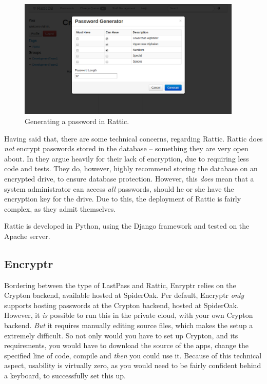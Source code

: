 			\begin{figure}[h!]
				\centering
				\includegraphics[width=0.95\textwidth]{figures/analysis/rattic_newpassword_passwordgen.png}
				\caption{Generating a password in Rattic.}
				\label{fig:rattic_newpassword_passwordgen}
			\end{figure}

			Having said that, there are some technical concerns, regarding Rattic. Rattic does \emph{not} encrypt passwords stored in the database -- something they are very open about. In \cite{rattic_encryption} they argue heavily for their lack of encryption, due to requiring less code and tests. They do, however, highly recommend storing the database on an encrypted drive, to ensure database protection. However, this \emph{does} mean that a system administrator can access \emph{all} passwords, should he or she have the encryption key for the drive. Due to this, the deployment of Rattic is fairly complex, as they admit themselves. 

			Rattic is developed in Python, using the Django framework and tested on the Apache server.

		\subsection*{Encryptr}
			Bordering between the type of LastPass and Rattic, Enryptr \cite{encryptr} relies on the Crypton\cite{crypton} backend\cite{encryptr_backend}, available hosted at SpiderOak\cite{crypton_spideroak}. Per default, Encryptr \emph{only} supports hosting passwords at the Crypton backend, hosted at SpiderOak. However, it \emph{is} possible to run this in the private cloud, with your own Crypton backend. \emph{But} it requires manually editing source files\cite{encryptr_selfhost}, which makes the setup a extremely difficult. So not only would you have to set up Crypton, and its requirements, you would have to download the source of the apps, change the specified line of code, compile and \emph{then} you could use it. Because of this technical aspect, usability is virtually zero, as you would need to be fairly confident behind a keyboard, to successfully set this up.

